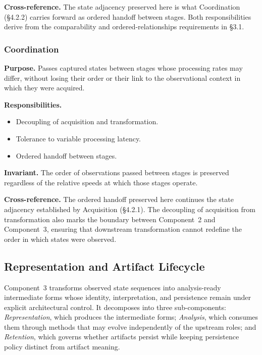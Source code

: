   \textbf{Cross-reference.} The state adjacency preserved here is what Coordination (\S4.2.2) carries forward as ordered handoff between stages. Both responsibilities derive from the comparability and ordered-relationships requirements in \S3.1.

  \subsubsection{Coordination}\label{subsubsec:coordination}
  \textbf{Purpose.} Passes captured states between stages whose processing rates may differ, without losing their order or their link to the observational context in which they were acquired.

  \textbf{Responsibilities.}
  \begin{itemize}
    \item Decoupling of acquisition and transformation.
    \item Tolerance to variable processing latency.
    \item Ordered handoff between stages.
  \end{itemize}

  \textbf{Invariant.} The order of observations passed between stages is preserved regardless of the relative speeds at which those stages operate.

  \textbf{Cross-reference.} The ordered handoff preserved here continues the state adjacency established by Acquisition (\S4.2.1). The decoupling of acquisition from transformation also marks the boundary between Component~2 and Component~3, ensuring that downstream transformation cannot redefine the order in which states were observed.



\subsection{Representation and Artifact Lifecycle}\label{subsec:rep-artifact}

Component~3 transforms observed state sequences into analysis-ready intermediate forms whose identity, interpretation, and persistence remain under explicit architectural control. It decomposes into three sub-components: \emph{Representation}, which produces the intermediate forms; \emph{Analysis}, which consumes them through methods that may evolve independently of the upstream roles; and \emph{Retention}, which governs whether artifacts persist while keeping persistence policy distinct from artifact meaning.


